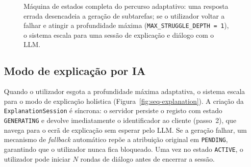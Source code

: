 \begin{figure}[H]
{
	}%
	\caption[M\'aquina de estados do percurso adaptativo]{M\'aquina de estados completa do percurso adaptativo: uma resposta errada desencadeia a gera\c{c}\~ao de subtarefas; se o utilizador voltar a falhar e atingir a profundidade m\'axima (\texttt{MAX\_STRUGGLE\_DEPTH = 1}), o sistema escala para uma sess\~ao de explica\c{c}\~ao e di\'alogo com o LLM.}
	\label{fig:maquina-estados}
\end{figure}

\subsection{Modo de explica\c{c}\~ao por IA}
\label{ssec:seq-explanation}

Quando o utilizador esgota a profundidade m\'axima adaptativa, o sistema
escala para o modo de explica\c{c}\~ao hol\'istica
(Figura~\ref{fig:seq-explanation}). A cria\c{c}\~ao da
\texttt{ExplanationSession} \'e s\'incrona: o servidor persiste o registo
com estado \texttt{GENERATING} e devolve imediatamente o identificador ao
cliente (passo~2), que navega para o ecr\~a de explica\c{c}\~ao sem esperar
pelo LLM. Se a gera\c{c}\~ao falhar, um mecanismo de \emph{fallback}
autom\'atico repõe a atribui\c{c}\~ao original em \texttt{PENDING},
garantindo que o utilizador nunca fica bloqueado. Uma vez no estado
\texttt{ACTIVE}, o utilizador pode iniciar $N$ rondas de di\'alogo antes
de encerrar a sess\~ao.

